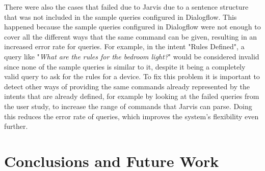 \documentclass[runningheads]{llncs}
\begin{document}
There were also the cases that failed due to Jarvis due to a sentence structure that was not included in the sample queries configured in Dialogflow. This happened because the sample queries configured in Dialogflow were not enough to cover all the different ways that the same command can be given, resulting in an increased error rate for queries. For example, in the intent "Rules Defined", a query like "\textit{What are the rules for the bedroom light?}" would be considered invalid since none of the sample queries is similar to it, despite it being a completely valid query to ask for the rules for a device. To fix this problem it is important to detect other ways of providing the same commands already represented by the intents that are already defined, for example by looking at the failed queries from the user study, to increase the range of commands that Jarvis can parse. Doing this reduces the error rate of queries, which improves the system's flexibility even further.

\section{Conclusions and Future Work}




\end{document}
